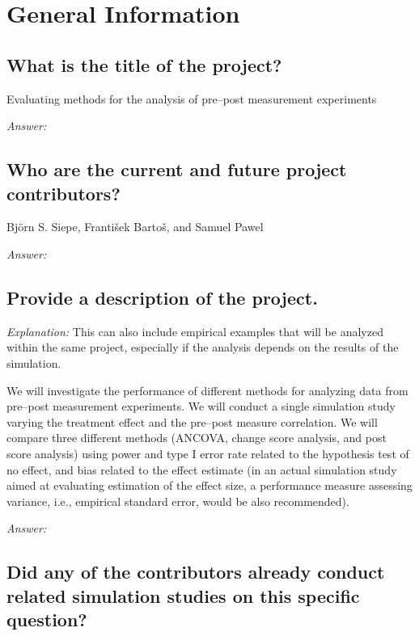 \documentclass[12pt]{article}
\begin{document}
\section{General Information}
\subsection{What is the title of the project?}

\begin{examplebox}
    Evaluating methods for the analysis of pre--post measurement experiments
\end{examplebox}

\textit{Answer:}

\subsection{Who are the current and future project contributors?}

\begin{examplebox}
    Björn S. Siepe, František Bartoš, and Samuel Pawel
\end{examplebox}

\textit{Answer:}

\subsection{Provide a description of the project.}

\textit{Explanation:} This can also include empirical examples that will be analyzed within the same project, especially if the analysis depends on the results of the simulation.

\begin{examplebox}
    We will investigate the performance of different methods for analyzing data from pre--post measurement experiments. We will conduct a single simulation study varying the treatment effect and the pre--post measure correlation. We will compare three different methods (ANCOVA, change score analysis, and post score analysis) using power and type I error rate related to the hypothesis test of no effect, and bias related to the effect estimate (in an actual simulation study aimed at evaluating estimation of the effect size, a performance measure assessing variance, i.e., empirical standard error, would be also recommended).
\end{examplebox}

\textit{Answer:}

\subsection{Did any of the contributors already conduct related simulation studies on this specific question?}
\end{document}
